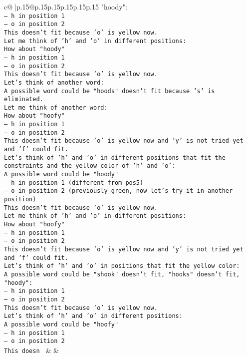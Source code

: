 \documentclass{article}
\begin{document}
{\begin{supertabular}{c@{$\;$}|p{.15\linewidth}@{}p{.15\linewidth}p{.15\linewidth}p{.15\linewidth}p{.15\linewidth}p{.15\linewidth}}
{{{"hoody": \\ \tt — h in position 1\\ \tt — o in position 2\\ \tt This doesn't fit because 'o' is yellow now. \\ \tt Let me think of 'h' and 'o' in different positions: \\ \tt How about "hoody" \\ \tt — h in position 1\\ \tt — o in position 2\\ \tt This doesn't fit because 'o' is yellow now. \\ \tt Let's think of another word: \\ \tt A possible word could be "hoods" doesn't fit because 's' is eliminated. \\ \tt Let me think of another word: \\ \tt How about "hoofy" \\ \tt — h in position 1\\ \tt — o in position 2\\ \tt This doesn't fit because 'o' is yellow now and 'y' is not tried yet and 'f' could fit.\\ \tt Let's think of 'h' and 'o' in different positions that fit the constraints and the yellow color of 'h' and 'o': \\ \tt A possible word could be "hoody" \\ \tt — h in position 1 (different from pos5)\\ \tt — o in position 2 (previously green, now let's try it in another position)\\ \tt This doesn't fit because 'o' is yellow now.\\ \tt Let me think of 'h' and 'o' in different positions: \\ \tt How about "hoofy" \\ \tt — h in position 1\\ \tt — o in position 2\\ \tt This doesn't fit because 'o' is yellow now and 'y' is not tried yet and 'f' could fit.\\ \tt Let's think of 'h' and 'o' in positions that fit the yellow color: \\ \tt A possible word could be "shook" doesn't fit, "hooks" doesn't fit, "hoody": \\ \tt — h in position 1\\ \tt — o in position 2\\ \tt This doesn't fit because 'o' is yellow now. \\ \tt Let's think of 'h' and 'o' in different positions: \\ \tt A possible word could be "hoofy" \\ \tt — h in position 1\\ \tt — o in position 2\\ \tt This doesn 
	  } 
	   } 
	   } 
	 & & \\ 
 


\end{supertabular}}
\end{document}

